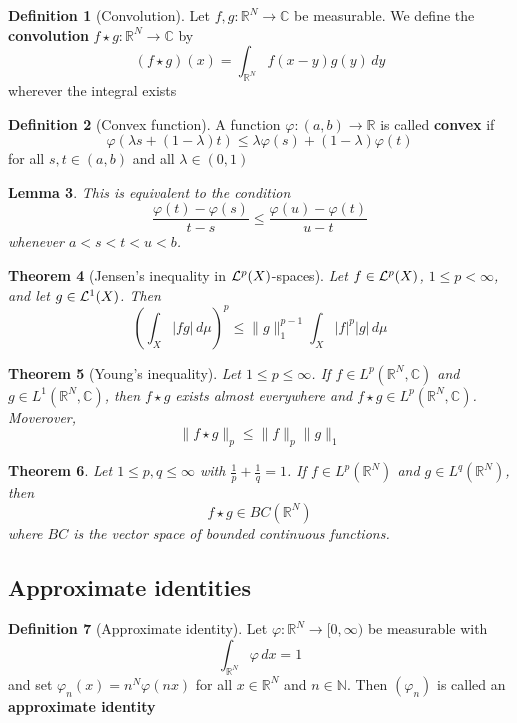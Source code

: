 \documentclass[10pt, oneside, reqno]{amsart}
\theoremstyle{plain}%
\newtheorem{thm}{Theorem}[section]
\newtheorem{lem}[thm]{Lemma}
\theoremstyle{definition}
\newtheorem{defn}[thm]{Definition}
\theoremstyle{remark}
\newcommand{\R}{\mathbb{R}}
\newcommand{\Com}{\mathbb{C}}
\newcommand{\dmu}{\, d \mu}
\renewcommand{\phi}{\varphi}
\begin{document}
\begin{defn}[Convolution]
    Let $f,g : \R^N \rightarrow \Com$ be measurable.  We define the \textbf{convolution} $f \star g : \R^N \rightarrow \Com$ by \[
        (f \star g) (x) = \int_{\R^N} f(x-y) g(y) \, dy
    \]
    wherever the integral exists
\end{defn}

\begin{defn}[Convex function]
    A function $\phi : (a,b) \rightarrow \R$ is called \textbf{convex} if \[
        \phi(\lambda s + (1-\lambda)t) \leq \lambda \phi(s) + (1-\lambda) \phi(t)
    \] for all $s,t \in (a,b)$ and all $\lambda \in (0,1)$
\end{defn}

\begin{lem}
    This is equivalent to the condition\[
        \frac{\phi(t) - \phi(s)}{t-s} \leq \frac{\phi(u) - \phi(t)}{u - t}
    \] whenever $a < s < t < u < b$.
\end{lem}

\begin{thm}[Jensen's inequality in $\mathcal{L}^{p}(X)$-spaces]
    Let $f \in \mathcal{L}^{p}(X)$, $1\leq p < \infty$, and let $g \in \mathcal{L}^{1}(X)$.  Then \[
        \left(\int_X |fg| \dmu \right)^p \leq \|g\|^{p-1}_1 \int_X |f|^p |g| \dmu
    \]
\end{thm}

\begin{thm}[Young's inequality]
    Let $1 \leq p \leq \infty$.  If $f \in L^p(\R^N, \Com)$ and $g \in L^1(\R^N, \Com)$, then $f \star g$ exists almost everywhere and $f \star g \in L^p(\R^N, \Com)$.  Moverover, \[
        \|f \star g \|_p \leq \|f\|_p \|g \|_1
    \]
\end{thm}

\begin{thm}
    Let $1 \leq p, q \leq \infty$ with $\frac{1}{p} + \frac{1}{q} = 1$.  If $f \in L^p(\R^N)$ and $g \in L^q(\R^N)$, then \[
        f \star g \in BC(\R^N)
    \] where $BC$ is the vector space of bounded continuous functions.
\end{thm}


\subsection{Approximate identities} %
\label{sub:approximate_identities}

\begin{defn}[Approximate identity]
    Let $\phi: \R^N \rightarrow [0,\infty)$ be measurable with \[
        \int_{\R^N} \phi \, dx = 1
    \] and set $\phi_n(x) = n^N \phi(n x)$ for all $x \in \R^N$ and $n \in \mathbb{N}$.  Then $(\phi_n)$ is called an \textbf{approximate identity}
\end{defn}
\end{document}
